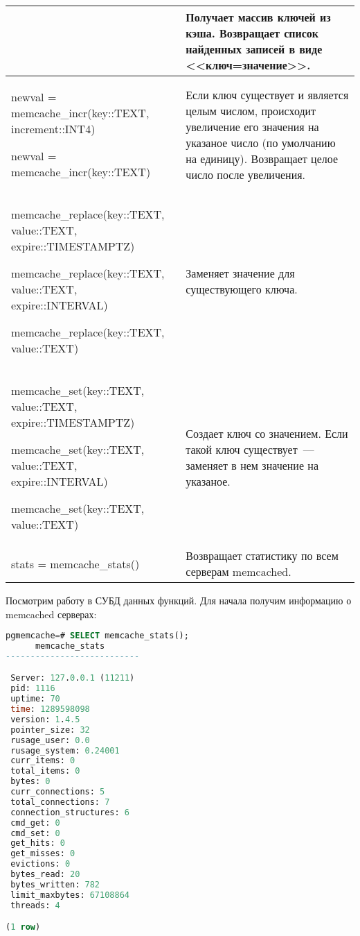 \begin{table}[h]
\begin{tabular}{| >{\raggedright\scriptsize}p{7cm}| >{\scriptsize}p{7cm} |}
&
Получает массив ключей из кэша.
Возвращает список найденных записей в виде <<ключ=значение>>.\\

\hline

newval = memcache\_incr(key::TEXT, increment::INT4)

newval = memcache\_incr(key::TEXT)

&
Если ключ существует и является целым числом, происходит увеличение
его значения на указаное число (по умолчанию на единицу).
Возвращает целое число после увеличения.\\

\hline

memcache\_replace(key::TEXT, value::TEXT, expire::TIMESTAMPTZ)

memcache\_replace(key::TEXT, value::TEXT, expire::INTERVAL)

memcache\_replace(key::TEXT, value::TEXT)

&
Заменяет значение для существующего ключа.\\

\hline

memcache\_set(key::TEXT, value::TEXT, expire::TIMESTAMPTZ)

memcache\_set(key::TEXT, value::TEXT, expire::INTERVAL)

memcache\_set(key::TEXT, value::TEXT)

&
Создает ключ со значением. Если такой ключ существует~--- заменяет в нем значение на указаное.\\

\hline

stats = memcache\_stats()

&
Возвращает статистику по всем серверам memcached.\\

\hline
\end{tabular}
\end{table}

Посмотрим работу в СУБД данных функций. Для начала получим информацию о memcached серверах:

\begin{lstlisting}[language=SQL,label=lst:pgcache8,caption=Проверка memcache\_stats]
pgmemcache=# SELECT memcache_stats();
      memcache_stats
---------------------------

 Server: 127.0.0.1 (11211)
 pid: 1116
 uptime: 70
 time: 1289598098
 version: 1.4.5
 pointer_size: 32
 rusage_user: 0.0
 rusage_system: 0.24001
 curr_items: 0
 total_items: 0
 bytes: 0
 curr_connections: 5
 total_connections: 7
 connection_structures: 6
 cmd_get: 0
 cmd_set: 0
 get_hits: 0
 get_misses: 0
 evictions: 0
 bytes_read: 20
 bytes_written: 782
 limit_maxbytes: 67108864
 threads: 4

(1 row)
\end{lstlisting}

